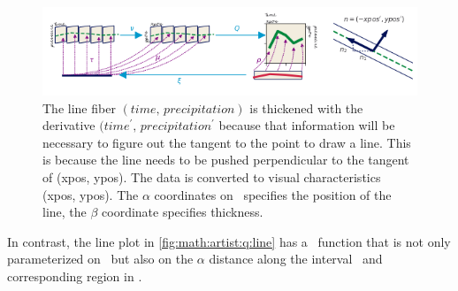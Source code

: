 \documentclass[../main.tex]{subfiles}
\begin{document}
\begin{figure}[H]
    \includegraphics[width=\textwidth]{figures/math/line.png}
    \caption{The line fiber $(time,\, precipitation)$ is thickened with the derivative $(time^{\prime},\, precipitation^{\prime}$ because that information will be necessary to figure out the tangent to the point to draw a line. This is because the line needs to be pushed perpendicular to the tangent of (xpos, ypos). The data is converted to visual characteristics (xpos, ypos). The $\alpha$ coordinates on \gbase\ specifies the position of the line, the $\beta$ coordinate specifies thickness.}
    \label{fig:math:artist:q:line}
\end{figure}
In contrast, the line plot in \autoref{fig:math:artist:q:line} has a \vindex\ function that is not only parameterized on \dbasepoint\ but also on the $\alpha$ distance along the interval \dbasepoint\ and corresponding region in \gbase. 
\end{document}
